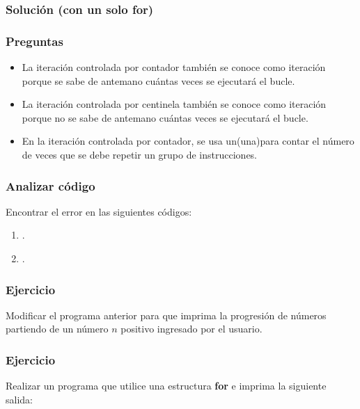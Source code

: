 \subsubsection{Solución (con un solo for)}

{\small
  \lstset{inputencoding=utf8/latin1}
  
}

\subsubsection{Preguntas}
\begin{itemize}
  \item La iteración controlada por contador también se conoce como iteración \underspace porque se sabe de antemano cuántas veces se ejecutará el bucle.
  \item La iteración controlada por centinela también se conoce como iteración \underspace porque no se sabe de antemano cuántas veces se ejecutará el bucle.
  \item En la iteración controlada por contador, se usa un(una)\underspace  para contar el número de veces que se debe repetir un grupo de instrucciones.
\end{itemize}

\subsubsection{Analizar código}
Encontrar el error en las siguientes códigos:
\begin{enumerate}
  \item .
  
  \item .
  
\end{enumerate}

\subsubsection{Ejercicio}
Modificar el programa anterior para que imprima la progresión de números partiendo de un número $n$ positivo ingresado por el usuario. 
{\small
  \lstset{inputencoding=utf8/latin1}
  
}

\subsubsection{Ejercicio}
Realizar un programa que utilice una estructura \textbf{for} e imprima la siguiente salida:
{\small
  \lstset{inputencoding=utf8/latin1}
  
}

